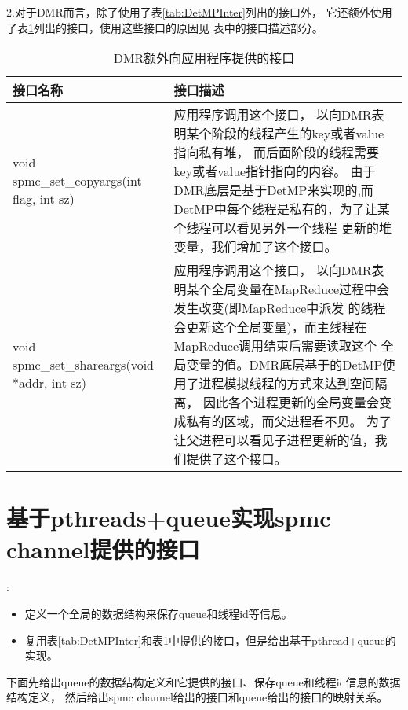 2.对于DMR而言，除了使用了表\ref{tab:DetMPInter}列出的接口外，
它还额外使用了表\ref{tab:DMRInter}列出的接口，使用这些接口的原因见
表中的接口描述部分。
\begin{table}[!h]
\begin{footnotesize}
  \caption{DMR额外向应用程序提供的接口}
  \begin{tabularx}{1.2\textwidth}{|p{}|p{}|}
  \hline
  \textbf{接口名称} & \textbf{接口描述}\\
  \hline
  void spmc\_set\_copyargs(int flag, int sz) & 应用程序调用这个接口，
  以向DMR表明某个阶段的线程产生的key或者value指向私有堆，
  而后面阶段的线程需要key或者value指针指向的内容。
  由于DMR底层是基于DetMP来实现的,而DetMP中每个线程是私有的，为了让某个线程可以看见另外一个线程
  更新的堆变量，我们增加了这个接口。\\
  \hline
  void spmc\_set\_shareargs(void *addr, int sz) & 应用程序调用这个接口，
  以向DMR表明某个全局变量在MapReduce过程中会发生改变(即MapReduce中派发
  的线程会更新这个全局变量)，而主线程在MapReduce调用结束后需要读取这个
  全局变量的值。DMR底层基于的DetMP使用了进程模拟线程的方式来达到空间隔离，
  因此各个进程更新的全局变量会变成私有的区域，而父进程看不见。
  为了让父进程可以看见子进程更新的值，我们提供了这个接口。
  \\
  \hline
 \end{tabularx}
\label{tab:DMRInter}
\end{footnotesize}
\end{table}

\section{基于pthreads+queue实现spmc channel提供的接口}
\paragraph{}:
\begin{itemize}
\item{定义一个全局的数据结构来保存queue和线程id等信息。}
\item{复用表\ref{tab:DetMPInter}和表\ref{tab:DMRInter}中提供的接口，但是给出基于pthread+queue的实现。}
\end{itemize}


下面先给出queue的数据结构定义和它提供的接口、保存queue和线程id信息的数据结构定义，
然后给出spmc channel给出的接口和queue给出的接口的映射关系。

